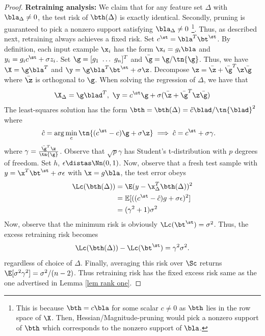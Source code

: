 \begin{proof}
\noindent \textbf{Retraining analysis:} We claim that for any feature set $\Delta$ with $\bla_{\Delta}\neq 0$, the test risk of $\bth(\Delta)$ is exactly identical. Secondly, pruning is guaranteed to pick a  nonzero support satisfying $\bla_{\Delta}\neq 0$ \footnote{This is because $\bth=c\bla$ for some scalar $c\neq 0$ as $\bth$ lies in the row space of $\X$. Then, Hessian/Magnitude-pruning would pick a nonzero support of $\bth$ which corresponds to the nonzero support of $\bla$.}. Thus, as described next, retraining always achieves a fixed risk. Set $c^\st=\bla^T\bt^\st$. By definition, each input example $\x_i$ has the form $\x_i=g_i\bla$ and $y_i=g_ic^\st+\sigma z_i$. Set $\g=[g_1~\dots~g_n]^T$ and $\bar{\g}=\g/\tn{\g}$. Thus, we have $\X=\g\bla^T$ and $\y=\g\bla^T\bt^\st+\sigma\z$. Decompose $\z=\bar{\z}+\bar{\g}^T\z\bar{\g}$ where $\bar{\z}$ is orthogonal to $\g$. When solving the regression of $\Delta$, we have that 
\[
\X_\Delta=\g\blad^T,~\y=c^\st\g+\sigma(\bar{\z}+\bar{\g}^T\z\bar{\g})
\]
The least-squares solution has the form $\bth=\bth(\Delta)=\hat{c}\blad/\tn{\blad}^2$ where
\begin{align}
&\hat{c}=\arg\min_{c}\tn{(c^\st-c)\g+\sigma\z}\implies\hat{c}=c^\st+\sigma\gamma\label{beta}.
\end{align}
where $\gamma=\frac{\bar{\g}^T\z}{\tn{\g}}$. Observe that $\sqrt{p}\gamma$ has Student's t-distribution with $p$ degrees of freedom. Set $h$, $\epsilon\distas \Nn(0,1)$. Now, observe that a fresh test sample with $y=\x^T\bt^\st+\sigma \epsilon$ with $\x=g\bla$, the test error obeys
\begin{align}
\Lc(\bth(\Delta))&=\E(y-\x_{\Delta}^T\bth(\Delta))^2\\
&=\mathbb{E}[((c^\st-\hat{c})g+\sigma\epsilon)^2]\\
&=(\gamma^2+1)\sigma^2
\end{align}
Now, observe that the minimum risk is obviously $\Lc(\bt^\st)=\sigma^2$. Thus, the excess retraining risk becomes
\[
\Lc(\bth(\Delta))-\Lc(\bt^\st)=\gamma^2\sigma^2.
\]
regardless of choice of $\Delta$. Finally, averaging this risk over $\Sc$ returns $\E[\sigma^2\gamma^2]=\sigma^2/(n-2)$. Thus retraining risk has the fixed excess risk same as the one advertised in Lemma \ref{lem rank one}.


\end{proof}
